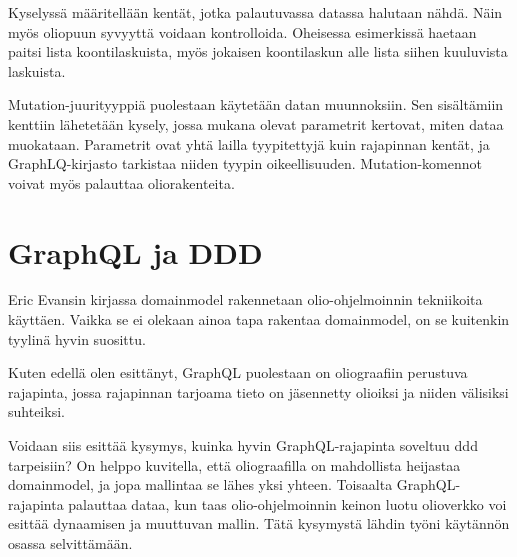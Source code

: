 Kyselyssä määritellään kentät, jotka palautuvassa datassa halutaan
nähdä. Näin myös oliopuun syvyyttä voidaan kontrolloida. Oheisessa
esimerkissä haetaan paitsi lista koontilaskuista, myös jokaisen
koontilaskun alle lista siihen kuuluvista laskuista.

Mutation-juurityyppiä puolestaan käytetään datan muunnoksiin. Sen
sisältämiin kenttiin lähetetään kysely, jossa mukana olevat parametrit
kertovat, miten dataa muokataan. Parametrit ovat yhtä lailla
tyypitettyjä kuin rajapinnan kentät, ja GraphLQ-kirjasto tarkistaa
niiden tyypin oikeellisuuden. Mutation-komennot voivat myös palauttaa
oliorakenteita.

\hypertarget{graphql-ja-ddd}{%
\section{GraphQL ja DDD}\label{graphql-ja-ddd}}

Eric Evansin kirjassa \gls{domainmodel} rakennetaan olio-ohjelmoinnin
tekniikoita käyttäen. Vaikka se ei olekaan ainoa tapa rakentaa
\gls{domainmodel}, on se kuitenkin tyylinä hyvin suosittu.

Kuten edellä olen esittänyt, GraphQL puolestaan on oliograafiin
perustuva rajapinta, jossa rajapinnan tarjoama tieto on jäsennetty
olioiksi ja niiden välisiksi suhteiksi.

Voidaan siis esittää kysymys, kuinka hyvin GraphQL-rajapinta soveltuu
\gls{ddd} tarpeisiin? On helppo kuvitella, että oliograafilla on
mahdollista heijastaa \gls{domainmodel}, ja jopa mallintaa se lähes yksi
yhteen. Toisaalta GraphQL-rajapinta palauttaa dataa, kun taas
olio-ohjelmoinnin keinon luotu olioverkko voi esittää dynaamisen ja
muuttuvan mallin. Tätä kysymystä lähdin työni käytännön osassa
selvittämään.
